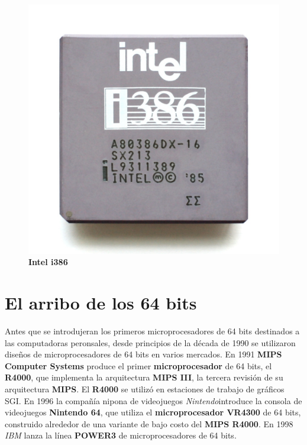 \begin{figure}[htb]
	\centering
	\includegraphics[scale = 0.1]{Graphics/Intel_i386DX.jpg}
	\caption{\textbf{Intel i386}}
	\label{fig:18}
\end{figure}
\newpage

\section{El arribo de los 64 bits}
Antes que se introdujeran los primeros microprocesadores de 64 bits destinados a las computadoras peronsales, desde principios de la década de
1990 se utilizaron diseños de microprocesadores de 64 bits en varios mercados. En 1991 \textbf{MIPS Computer Systems} produce el primer \textbf
{microprocesador} de 64 bits, el \textbf{R4000}, que implementa la arquitectura \textbf{MIPS III}, la tercera revisión de su arquitectura \textbf{MIPS}.
El \textbf{R4000} se utilizó en estaciones de trabajo de gráficos SGI. En 1996 la compañía nipona de videojuegos \emph{Nintendo}introduce la consola de
videojuegos \textbf{Nintendo 64}, que utiliza el \textbf{microprocesador VR4300} de 64 bits, construido alrededor de una variante de bajo costo del
\textbf{MIPS R4000}. En 1998 \emph{IBM} lanza la línea \textbf{POWER3} de microprocesadores de 64 bits. 

